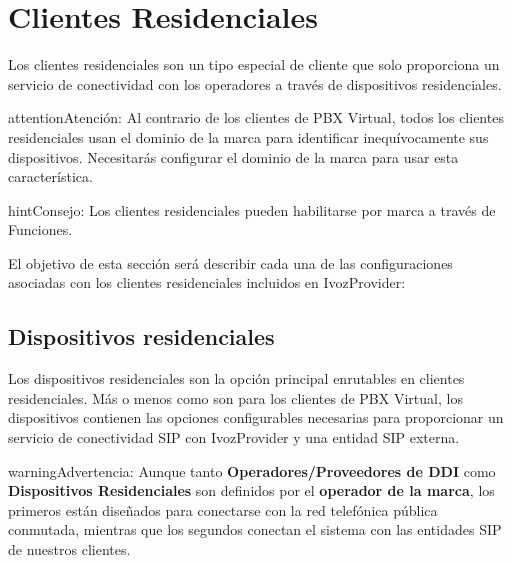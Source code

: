\documentclass[letterpaper,10pt,spanish]{sphinxmanual}
\begin{document}
\section{Clientes Residenciales}
\label{administration_portal/client/residential/index:residential-clients}\label{administration_portal/client/residential/index:id1}\label{administration_portal/client/residential/index::doc}\label{administration_portal/client/residential/index:clientes-residenciales}
Los clientes residenciales son un tipo especial de cliente que solo proporciona un servicio de conectividad con los operadores a través de dispositivos residenciales.

\begin{notice}{attention}{Atención:}
Al contrario de los clientes de PBX Virtual, todos los clientes residenciales usan el dominio de la marca para identificar inequívocamente sus dispositivos. Necesitarás configurar el dominio de la marca para usar esta característica.
\end{notice}

\begin{notice}{hint}{Consejo:}
Los clientes residenciales pueden habilitarse por marca a través de Funciones.
\end{notice}

El objetivo de esta sección será describir cada una de las configuraciones asociadas con los clientes residenciales incluidos en IvozProvider:


\subsection{Dispositivos residenciales}
\label{administration_portal/client/residential/residential_devices:id1}\label{administration_portal/client/residential/residential_devices::doc}\label{administration_portal/client/residential/residential_devices:residential-devices}
Los dispositivos residenciales son la opción principal enrutables en clientes residenciales. Más o menos como {\hyperref[administration_portal/client/vpbx/routing_endpoints/friends/index:friends]{}} son para los clientes de PBX Virtual, los dispositivos contienen las opciones configurables necesarias para proporcionar un servicio de conectividad SIP con IvozProvider y una entidad SIP externa.

\begin{notice}{warning}{Advertencia:}
Aunque tanto \textbf{Operadores/Proveedores de DDI} como \textbf{Dispositivos Residenciales} son definidos por el \textbf{operador de la marca}, los primeros están diseñados para conectarse con la red telefónica pública conmutada, mientras que los segundos conectan el sistema con las entidades SIP de nuestros clientes.
\end{notice}
\end{document}
